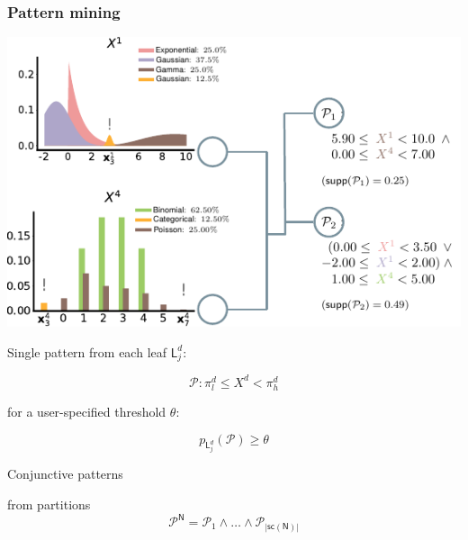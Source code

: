 \documentclass[xcolor={usenames,dvipsnames,svgnames}, compress, aspectratio=169, 11pt]{beamer}
\newcommand{\Node}{\mathsf{N}}
\newcommand{\Leaf}{\mathsf{L}}
\newcommand{\scope}{\mathsf{sc}}
\begin{document}
\begin{frame}[t, htt=bgrey2]
  \frametitle{Pattern mining}

  \large
  \begin{minipage}[t]{0.6\linewidth}
    \vspace{5pt}
    \includegraphics[width=.99\linewidth]{figures/abda-pattern-mining}
  \end{minipage}\hfill\begin{minipage}[t]{0.37\linewidth}
    \raggedright
    \vspace{10pt}

    Single pattern from each leaf $\Leaf^d_{j}$:

    $$\mathcal{P}\colon \pi_{l}^{d}\leq X^{d}<\pi_{h}^{d}$$

    for a user-specified threshold $\theta$:

    $$p_{\Leaf^d_{j}}(\mathcal{P}) \geq \theta$$

    Conjunctive patterns\par from partitions
    $$\mathcal{P}^{\Node}=\mathcal{P}_{1}\wedge\ldots\wedge\mathcal{P}_{|\scope(\Node)|}$$

     
    
  \end{minipage}  
\end{frame}
\end{document}
